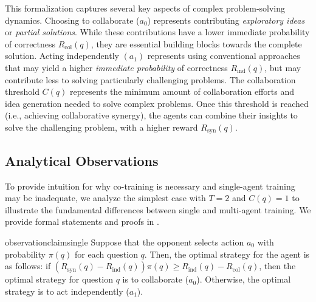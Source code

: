 \vspace{-3mm}
\begin{remark}
\label{rmk:rationale}
\upshape
This formalization captures several key aspects of complex problem-solving dynamics. Choosing to collaborate ($a_0$) represents contributing \textit{exploratory ideas} or \textit{partial solutions}. While these contributions have a lower immediate probability of correctness \(R_{\text{col}}(q)\), they are essential building blocks towards the complete solution. Acting independently $(a_1)$ represents using conventional approaches that may yield a higher \textit{immediate probability} of correctness \(R_{\text{ind}}(q)\), but may contribute less to solving particularly challenging problems. The collaboration threshold \(C(q)\) represents the minimum amount of collaboration efforts and idea generation needed to solve complex problems. Once this threshold is reached (i.e., achieving collaborative synergy), the agents can combine their insights to solve the challenging problem, with a higher  reward \(R_{\text{syn}}(q)\).
\end{remark}
\vspace{-3mm}

\safevspace{-3mm}

\subsection{Analytical Observations}
\safevspace{-1.5mm}

To provide intuition for why co-training is necessary and single-agent training may be inadequate, 
we analyze the simplest case with $T=2$ and $C(q) = 1$ to illustrate the fundamental differences between single and multi-agent training. We provide formal statements and proofs in .

 

\begin{restatable}{observation}{claimsingle}
\label{claim:1}
Suppose that the opponent selects action \( a_0 \) with probability \( \pi(q) \) for each question \( q \). Then, the optimal strategy for the agent is as follows: if  $(R_{\text{syn}}(q) - R_{\text{ind}}(q))\pi(q) \geq R_{\text{ind}}(q) - R_{\text{col}}(q)$, then the optimal strategy for question \( q \) is to collaborate (\( a_0 \)). Otherwise, the optimal strategy is to act independently (\( a_1 \)).
\end{restatable}

\safevspace{-2mm}


